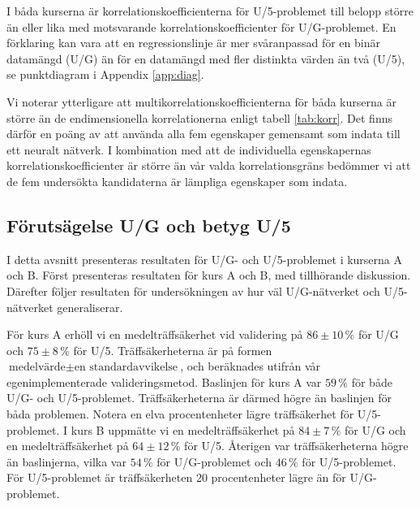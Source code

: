 I båda kurserna är korrelationskoefficienterna för U/5-problemet till belopp större än eller lika med motsvarande korrelationskoefficienter för U/G-problemet. En förklaring kan vara att en regressionslinje är mer svåranpassad för en binär datamängd (U/G) än för en datamängd med fler distinkta värden än två (U/5), se punktdiagram i Appendix \ref{app:diag}. 

Vi noterar ytterligare att multikorrelationskoefficienterna för båda kurserna är större än de endimensionella korrelationerna enligt tabell \ref{tab:korr}. Det finns därför en poäng av att använda alla fem egenskaper gemensamt som indata till ett neuralt nätverk. I kombination med att de individuella egenskapernas korrelationskoefficienter är större än vår valda korrelationsgräns bedömmer vi att de fem undersökta kandidaterna är lämpliga egenskaper som indata. 






\subsection{Förutsägelse U/G och betyg U/5}
\label{sec:results_ug_u5}

I detta avsnitt presenteras resultaten för U/G- och U/5-problemet i kurserna A och B. Först presenteras resultaten för kurs A och B, med tillhörande diskussion. Därefter följer resultaten för undersökningen av hur väl U/G-nätverket och U/5-nätverket generaliserar.

För kurs A erhöll vi en medelträffsäkerhet vid validering på $86\pm10 \, \%$ för U/G och $75\pm8 \, \%$ för U/5. Träffsäkerheterna är på formen $\text{medelvärde}\pm\text{en standardavvikelse}$, och beräknades utifrån vår egenimplementerade valideringsmetod. Baslinjen för kurs A var $59\, \%$ för både U/G- och U/5-problemet. Träffsäkerheterna är därmed högre än baslinjen för båda problemen. Notera en elva procentenheter lägre träffsäkerhet för U/5-problemet. I kurs B uppmätte vi en medelträffsäkerhet på $84\pm7 \, \% $ för U/G och en medelträffsäkerhet på $64\pm12 \,\%$ för U/5. Återigen var träffsäkerheterna högre än baslinjerna, vilka var $54\, \%$ för U/G-problemet och $46 \, \%$ för U/5-problemet. För U/5-problemet är träffsäkerheten 20 procentenheter lägre än för U/G-problemet.

